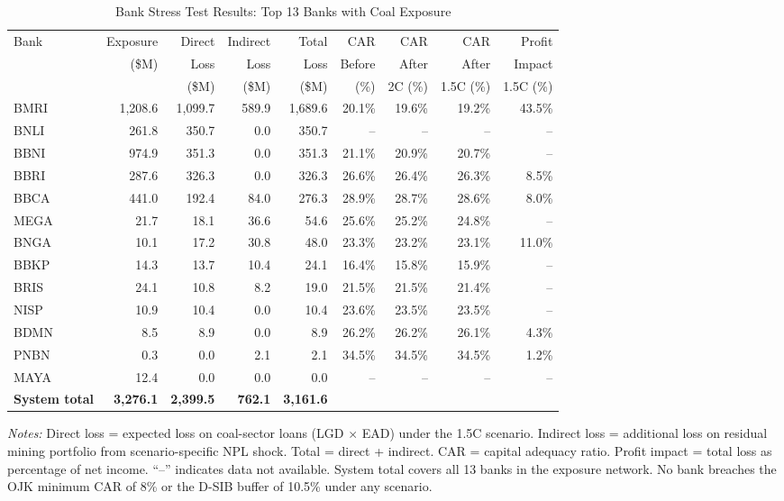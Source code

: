 \begin{table}[htbp]
\centering
\caption{Bank Stress Test Results: Top 13 Banks with Coal Exposure}
\label{tab:stress_test}
\footnotesize
\setlength{\tabcolsep}{3.5pt}
\begin{tabular}{lrrrrrrrr}
\toprule
Bank & Exposure & Direct & Indirect & Total & CAR & CAR & CAR & Profit \\
 & (\$M) & Loss & Loss & Loss & Before & After & After & Impact \\
 & & (\$M) & (\$M) & (\$M) & (\%) & 2\textdegree{}C (\%) & 1.5\textdegree{}C (\%) & 1.5\textdegree{}C (\%) \\
\midrule
  BMRI & 1,208.6 & 1,099.7 & 589.9 & 1,689.6 & 20.1\% & 19.6\% & 19.2\% & 43.5\% \\
  BNLI & 261.8 & 350.7 & 0.0 & 350.7 & -- & -- & -- & -- \\
  BBNI & 974.9 & 351.3 & 0.0 & 351.3 & 21.1\% & 20.9\% & 20.7\% & -- \\
  BBRI & 287.6 & 326.3 & 0.0 & 326.3 & 26.6\% & 26.4\% & 26.3\% & 8.5\% \\
  BBCA & 441.0 & 192.4 & 84.0 & 276.3 & 28.9\% & 28.7\% & 28.6\% & 8.0\% \\
  MEGA & 21.7 & 18.1 & 36.6 & 54.6 & 25.6\% & 25.2\% & 24.8\% & -- \\
  BNGA & 10.1 & 17.2 & 30.8 & 48.0 & 23.3\% & 23.2\% & 23.1\% & 11.0\% \\
  BBKP & 14.3 & 13.7 & 10.4 & 24.1 & 16.4\% & 15.8\% & 15.9\% & -- \\
  BRIS & 24.1 & 10.8 & 8.2 & 19.0 & 21.5\% & 21.5\% & 21.4\% & -- \\
  NISP & 10.9 & 10.4 & 0.0 & 10.4 & 23.6\% & 23.5\% & 23.5\% & -- \\
  BDMN & 8.5 & 8.9 & 0.0 & 8.9 & 26.2\% & 26.2\% & 26.1\% & 4.3\% \\
  PNBN & 0.3 & 0.0 & 2.1 & 2.1 & 34.5\% & 34.5\% & 34.5\% & 1.2\% \\
  MAYA & 12.4 & 0.0 & 0.0 & 0.0 & -- & -- & -- & -- \\
\midrule
  \textbf{System total} & \textbf{3,276.1} & \textbf{2,399.5} & \textbf{762.1} & \textbf{3,161.6} & & & & \\
\bottomrule
\end{tabular}

\smallskip
\noindent \textit{Notes:} Direct loss = expected loss on coal-sector loans (LGD $\times$ EAD) under the 1.5\textdegree{}C scenario. Indirect loss = additional loss on residual mining portfolio from scenario-specific NPL shock. Total = direct + indirect. CAR = capital adequacy ratio. Profit impact = total loss as percentage of net income. ``--'' indicates data not available. System total covers all 13 banks in the exposure network. No bank breaches the OJK minimum CAR of 8\% or the D-SIB buffer of 10.5\% under any scenario.
\end{table}
